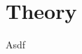 \documentclass[../bachelor_paper.tex]{subfiles}
\begin{document}
\chapter{Theory}
    \label{ch:theory}

Asdf

\isstandalone



\fi
\end{document}
